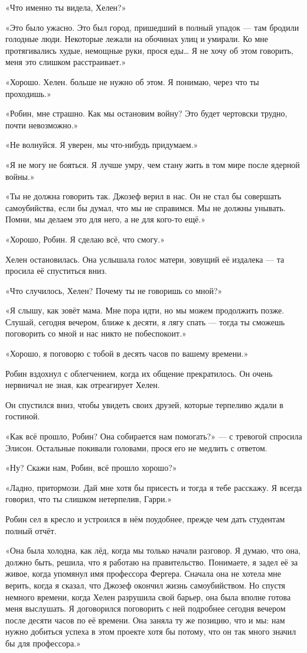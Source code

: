 \documentclass[a5paper, 9pt,
final, openany, twoside=true]{memoir}
\begin{document}
«Что именно ты видела, Хелен?»

«Это было ужасно. Это был город, пришедший в полный упадок — там бродили голодные люди. Некоторые лежали на обочинах улиц и умирали. Ко мне протягивались худые, немощные руки, прося еды… Я не хочу об этом говорить, меня это слишком расстраивает.»

«Хорошо. Хелен. больше не нужно об этом. Я понимаю, через что ты проходишь.»

«Робин, мне страшно. Как мы остановим войну? Это будет чертовски трудно, почти невозможно.»

«Не волнуйся. Я уверен, мы что-нибудь придумаем.»

«Я не могу не бояться. Я лучше умру, чем стану жить в том мире после ядерной войны.»

«Ты не должна говорить так. Джозеф верил в нас. Он не стал бы совершать самоубийства, если бы думал, что мы не справимся. Мы не должны унывать. Помни, мы делаем это для него, а не для кого-то ещё.»

«Хорошо, Робин. Я сделаю всё, что смогу.»

Хелен остановилась. Она услышала голос матери, зовущий её издалека — та просила её спуститься вниз.

«Что случилось, Хелен? Почему ты не говоришь со мной?»

«Я слышу, как зовёт мама. Мне пора идти, но мы можем продолжить позже. Слушай, сегодня вечером, ближе к десяти, я лягу спать — тогда ты сможешь поговорить со мной и нас никто не побеспокоит.»

«Хорошо, я поговорю с тобой в десять часов по вашему времени.»\bigskip

Робин вздохнул с облегчением, когда их общение прекратилось. Он очень нервничал не зная, как отреагирует Хелен.

Он спустился вниз, чтобы увидеть своих друзей, которые терпеливо ждали в гостиной.

«Как всё прошло, Робин? Она собирается нам помогать?» — с тревогой спросила Элисон. Остальные покивали головами, прося его не медлить с ответом.

«Ну? Скажи нам, Робин, всё прошло хорошо?»

«Ладно, притормози. Дай мне хотя бы присесть и тогда я тебе расскажу. Я всегда говорил, что ты слишком нетерпелив, Гарри.»

Робин сел в кресло и устроился в нём поудобнее, прежде чем дать студентам полный отчёт.

«Она была холодна, как лёд, когда мы только начали разговор. Я думаю, что она, должно быть, решила, что я работаю на правительство. Понимаете, я задел её за живое, когда упомянул имя профессора Фергера. Сначала она не хотела мне верить, когда я сказал, что Джозеф окончил жизнь самоубийством. Но спустя немного времени, когда Хелен разрушила свой барьер, она была вполне готова меня выслушать. Я договорился поговорить с ней подробнее сегодня вечером после десяти часов по её времени. Она заняла ту же позицию, что и мы: нам нужно добиться успеха в этом проекте хотя бы потому, что он так много значил бы для профессора.»
\end{document}

